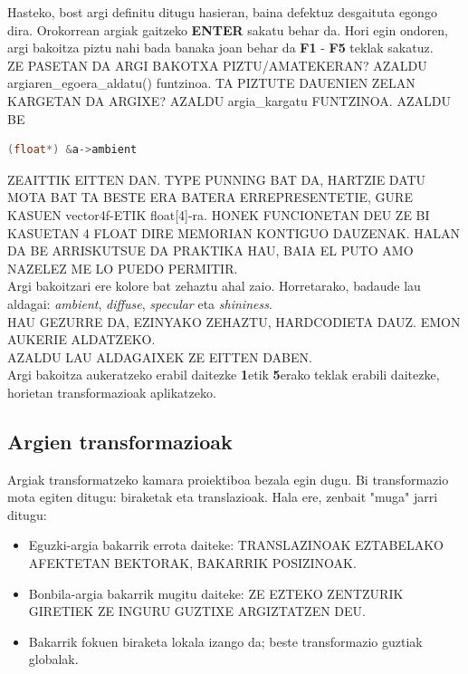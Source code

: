\documentclass[12pt]{article}
\newcommand{\aldagai}[1] {\textit{#1}}
\newcommand{\tekla}[1] {\textbf{#1}}
\begin{document}
Hasteko, bost argi definitu ditugu hasieran, baina defektuz desgaituta egongo dira. Orokorrean argiak gaitzeko \tekla{ENTER} sakatu behar da. Hori egin ondoren, argi bakoitza piztu nahi bada banaka joan behar da \tekla{F1} - \tekla{F5} teklak sakatuz.\\

ZE PASETAN DA ARGI BAKOTXA PIZTU/AMATEKERAN? AZALDU argiaren\_egoera\_aldatu() funtzinoa. TA PIZTUTE DAUENIEN ZELAN KARGETAN DA ARGIXE? AZALDU argia\_kargatu FUNTZINOA. AZALDU BE

\begin{lstlisting}[language=C]
(float*) &a->ambient
\end{lstlisting}

ZEAITTIK EITTEN DAN. TYPE PUNNING BAT DA, HARTZIE DATU MOTA BAT TA BESTE ERA BATERA ERREPRESENTETIE, GURE KASUEN vector4f-ETIK float[4]-ra. HONEK FUNCIONETAN DEU ZE BI KASUETAN 4 FLOAT DIRE MEMORIAN KONTIGUO DAUZENAK. HALAN DA BE ARRISKUTSUE DA PRAKTIKA HAU, BAIA EL PUTO AMO NAZELEZ ME LO PUEDO PERMITIR.\\

Argi bakoitzari ere kolore bat zehaztu ahal zaio. Horretarako, badaude lau aldagai:  \aldagai{ambient}, \aldagai{diffuse}, \aldagai{specular} eta \aldagai{shininess}.\\

HAU GEZURRE DA, EZINYAKO ZEHAZTU, HARDCODIETA DAUZ. EMON AUKERIE ALDATZEKO.\\

AZALDU LAU ALDAGAIXEK ZE EITTEN DABEN.\\

Argi bakoitza aukeratzeko erabil daitezke \tekla{1}etik \tekla{5}erako teklak erabili daitezke, horietan transformazioak aplikatzeko.

\subsection{Argien transformazioak}

Argiak transformatzeko kamara proiektiboa bezala egin dugu. Bi transformazio mota egiten ditugu: biraketak eta translazioak. Hala ere, zenbait "muga" jarri ditugu:

\begin{itemize}
\item Eguzki-argia bakarrik errota daiteke: TRANSLAZINOAK EZTABELAKO AFEKTETAN BEKTORAK, BAKARRIK POSIZINOAK.

\item Bonbila-argia bakarrik mugitu daiteke: ZE EZTEKO ZENTZURIK GIRETIEK ZE INGURU GUZTIXE ARGIZTATZEN DEU.

\item Bakarrik fokuen biraketa lokala izango da; beste transformazio guztiak globalak.
\end{itemize}
\end{document}
